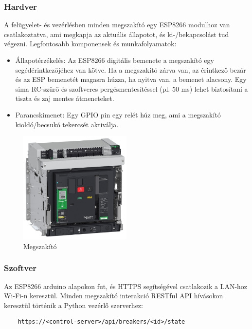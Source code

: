 \subsubsection{Hardver}

A felügyelet- és vezérlésben minden megszakító egy ESP8266 modulhoz van csatlakoztatva, 
ami megkapja az aktuális állapotot, és ki-/bekapcsolást tud végezni. 
Legfontosabb komponensek és munkafolyamatok:
\begin{itemize}
    \item Állapotérzékelés: Az ESP8266 digitális bemenete a megszakító egy 
    segédérintkezőjéhez van kötve. Ha a megszakító zárva van, az érintkező bezár 
    és az ESP bemenetét magasra húzza, ha nyitva van, a bemenet alacsony. 
    Egy sima RC-szűrő és szoftveres pergésmentesítéssel (pl. 50 ms) lehet biztosítani
    a tiszta és zaj mentes átmeneteket.
    \item Parancskimenet: Egy GPIO pin egy relét húz meg, ami a megszakító 
    kioldó/becsukó tekercsét aktiválja.
\end{itemize}

\begin{figure}[!ht]
    \centering
    \includegraphics[width=0.5\textwidth, keepaspectratio]{figures/MTZ.jpg}
    \caption{Megszakító \cite{SE:MasterpactMTZ}} 
\end{figure}

\subsubsection{Szoftver}

Az ESP8266 arduino alapokon fut, és HTTPS segítségével csatlakozik a LAN-hoz 
Wi-Fi-n keresztül. Minden megszakító interakció RESTful API hívásokon keresztül 
történik a Python vezérlő szerverhez:

\begin{lstlisting}
    https://<control-server>/api/breakers/<id>/state
\end{lstlisting}

